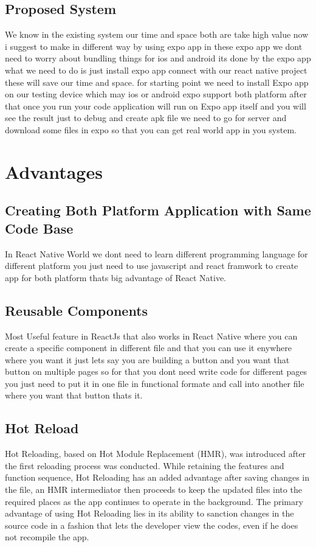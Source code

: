 \documentclass[12pt,a4paper]{report}
\begin{document}
\subsection{Proposed System}
We know in the existing system our time and space both are take high value now i suggest to make in different way by using expo app in these expo app we dont need to worry about bundling things for ios and android its done by the expo app what we need to do is just install expo app connect with our react native project these will save our time and space. for starting point we need to install Expo app on our testing device which may ios or android expo support both platform after that once you run your code application will run on Expo app itself and you will see the result just to debug and create apk file we need to go for server and download some files in expo so that you can get real world app in you system.

\newpage

\section{Advantages}

\subsection{Creating Both Platform Application with Same Code Base}
In React Native World we dont need to learn different programming language for different platform you just need to use javascript and react framwork to create app for both platform thats big advantage of React Native.

\subsection{Reusable Components}
Most Useful feature in ReactJs that also works in React Native where you can create a specific component in different file and that you can use it enywhere where you want  it just lets say you are building a button and you want that button on multiple pages so for that you dont need write code for different pages you just need to put it in one file in functional formate and call into another file where you want that button thats it.


\subsection{ Hot Reload }
Hot Reloading, based on Hot Module Replacement (HMR), was introduced after the first reloading process was conducted. While retaining the features and function sequence, Hot Reloading has an added advantage after saving changes in the file, an HMR intermediator then proceeds to keep the updated files into the required places as the app continues to operate in the background. The primary advantage of using Hot Reloading lies in its ability to sanction changes in the source code in a fashion that lets the developer view the codes, even if he does not recompile the app.
\end{document}
